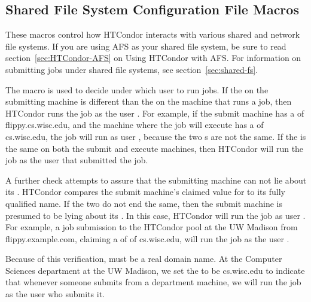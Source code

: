 \subsection{\label{sec:Shared-Filesystem-Config-File-Entries}Shared File System Configuration File Macros} 

These macros control how HTCondor interacts with various shared and
network file systems.  If you are using AFS as your shared file system,
be sure to read section~\ref{sec:HTCondor-AFS} on Using HTCondor with
AFS.
For information on submitting jobs under shared file systems,
see
section~\ref{sec:shared-fs}.
\begin{description}

\label{param:UidDomain}
\item[\Macro{UID\_DOMAIN}]
  The  macro
  is used to decide under which user to run jobs.
  If the 
  on the submitting machine is different than
  the 
  on the machine that runs a job, then HTCondor runs
  the job as the user .
  For example, if the submit machine has
  a  of
  flippy.cs.wisc.edu, and the machine where the job will execute
  has a  of
  cs.wisc.edu, the job will run as user , because
  the two s are not the same.
  If the 
  is the same on both the submit and execute machines,
  then HTCondor will run the job as the user that submitted the job.

  A further check attempts to assure that the submitting
  machine can not lie about its .
  HTCondor compares the 
  submit machine's claimed value for 
  to its fully qualified name.
  If the two do not end the same, then the submit machine
  is presumed to be lying about its .
  In this case, HTCondor will run the job as user .
  For example, a job submission to the HTCondor pool at the UW Madison
  from flippy.example.com, claiming a  of
  of cs.wisc.edu,
  will run the job as the user .

  Because of this verification,
   must be a real domain name.
  At the Computer Sciences department
  at the UW Madison, we set the 
  to be cs.wisc.edu to
  indicate that whenever someone submits from a department machine, we
  will run the job as the user who submits it.


\end{description}
